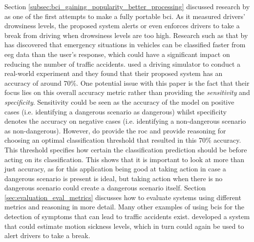 Section \ref{subsec:bci_gaining_popularity_better_processing} discussed research by \citet{early_bci_drowsiness} as one of the first attempts to make a fully portable \gls{bci}.
As it measured drivers' drowsiness levels, the proposed system alerts or even enforces drivers to take a break from driving when drowsiness levels are too high.
Research such as that by \citet{eeg_dangerous_situation_car} has discovered that emergency situations in vehicles can be classified faster from \gls{eeg} data than the user's response, which could have a significant impact on reducing the number of traffic accidents.
 used a driving simulator to conduct a real-world experiment and they found that their proposed system has an accuracy of around 70\%.
One potential issue with this paper is the fact that their focus lies on this overall accuracy metric rather than providing the \textit{sensitivity} and \textit{specificity}.
Sensitivity could be seen as the accuracy of the model on positive cases (i.e. identifying a dangerous scenario as dangerous) whilst specificity denotes the accuracy on negative cases (i.e. identifying a non-dangerous scenario as non-dangerous).
However, \citet{eeg_dangerous_situation_car} do provide the \gls{roc} and provide reasoning for choosing an optimal classification threshold that resulted in this 70\% accuracy.
This threshold specifies how certain the classification prediction should be before acting on its classification.
This shows that it is important to look at more than just accuracy, as for this application being good at taking action in case a dangerous scenario is present is ideal, but taking action when there is no dangerous scenario could create a dangerous scenario itself.
Section \ref{sec:evaluation_eval_metrics} discusses how to evaluate systems using different metrics and reasoning in more detail.
Many other examples of using \glspl{bci} for the detection of symptoms that can lead to traffic accidents exist. 
 developed a system that could estimate motion sickness levels, which in turn could again be used to alert drivers to take a break.

